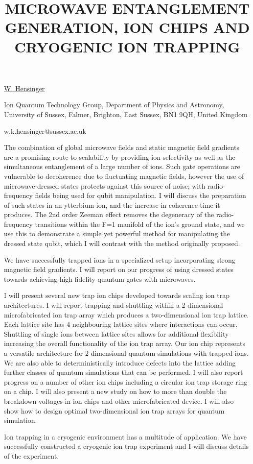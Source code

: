 \title{MICROWAVE ENTANGLEMENT GENERATION, ION CHIPS AND CRYOGENIC ION TRAPPING}

\underline{W. Hensinger} 

{\normalsize{\vspace{-4mm}
Ion Quantum Technology Group, Department of Physics and Astronomy,
University of Sussex, Falmer, Brighton, East Sussex, BN1 9QH, United Kingdom

\email w.k.hensinger@sussex.ac.uk}}

The combination of global microwave fields and static magnetic field gradients are a promising route
to scalability by providing ion selectivity as well as the simultaneous entanglement of a large
number of ions. Such gate operations are vulnerable to decoherence due to fluctuating magnetic
fields, however the use of microwave-dressed states protects against this source of noise; with
radio-frequency fields being used for qubit manipulation. I will discuss the preparation of such
states in an ytterbium ion, and the increase in coherence time it produces. The 2nd order Zeeman
effect removes the degeneracy of the radio-frequency transitions within the F=1 manifold of the
ion's ground state, and we use this to demonstrate a simple yet powerful method for manipulating the
dressed state qubit, which I will contrast with the method originally proposed.

We have successfully trapped ions in a specialized setup incorporating strong magnetic field
gradients. I will report on our progress of using dressed states towards achieving high-fidelity
quantum gates with microwaves.

I will present several new trap ion chips developed towards scaling ion trap architectures. I will
report trapping and shuttling within a 2-dimensional microfabricated ion trap array which produces a
two-dimensional ion trap lattice. Each lattice site has 4 neighbouring lattice sites where
interactions can occur. Shuttling of single ions between lattice sites allows for additional
flexibility increasing the overall functionality of the ion trap array. Our ion chip represents a
versatile architecture for 2-dimensional quantum simulations with trapped ions. We are also able to
deterministically introduce defects into the lattice adding further classes of quantum simulations
that can be performed. I will also report progress on a number of other ion chips including a
circular ion trap storage ring on a chip.  I will also present a new study on how to more than
double the breakdown voltages in ion chips and other microfabricated device. I will also show how to
design optimal two-dimensional ion trap arrays for quantum simulation.

Ion trapping in a cryogenic environment has a multitude of application.  We have successfully
constructed a cryogenic ion trap experiment and I will discuss details of the experiment.

\vspace{\baselineskip}
